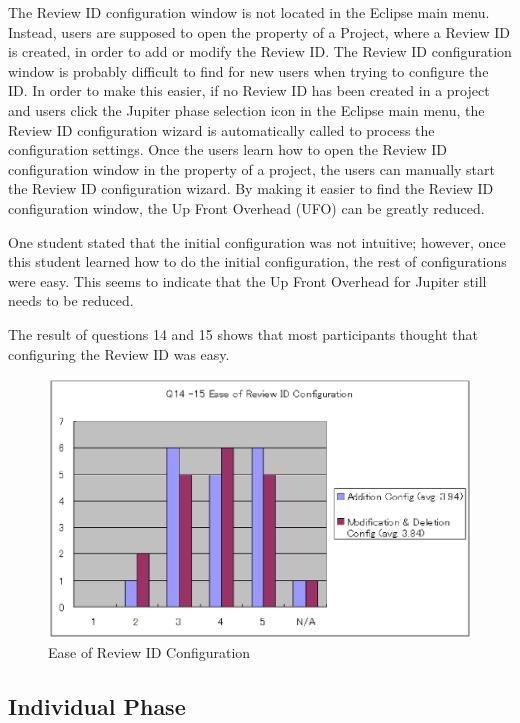 The Review ID configuration window is not located in the Eclipse main menu. Instead, users are supposed to open the property of a Project, where a Review ID is created, in order to add or modify the Review ID. The Review ID configuration window is probably difficult to find for new users when trying to configure the ID. In order to make this easier, if no Review ID has been created in a project and users click the Jupiter phase selection icon in the Eclipse main menu, the Review ID configuration wizard is automatically called to process the configuration settings. Once the users learn how to open the Review ID configuration window in the property of a project, the users can manually start the Review ID configuration wizard. By making it easier to find the Review ID configuration window, the Up Front Overhead (UFO) can be greatly reduced.

One student stated that the initial configuration was not intuitive; however, once this student learned how to do the initial configuration, the rest of configurations were easy. This seems to indicate that the Up Front Overhead for Jupiter still needs to be reduced.

The result of questions 14 and 15 shows that most participants thought that configuring the Review ID was easy.
 
\begin{figure}[htbp]
  \centering
  \includegraphics{images/fig5-3.eps}
  \caption{Ease of Review ID Configuration}
  \label{fig5-3}
\end{figure}

\subsection{Individual Phase}
\label{subsec:individual-phase}

